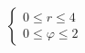 \documentclass[preview]{standalone}
\begin{document}
\begin{align*}
\left\{ \begin{array}{l}0 \leq r \leq 4 \\0 \leq \varphi \leq 2\end{array} \right.
\end{align*}
\end{document}
